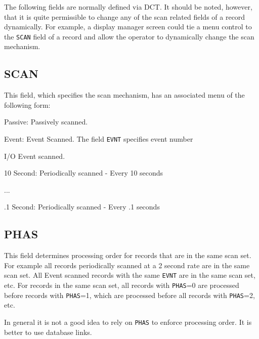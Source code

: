 The following fields are normally defined via DCT. It should be noted, however, that it is quite permissible to change any 
of the scan related fields of a record dynamically. For example, a display manager screen could tie a menu control to the 
\verb|SCAN| field of a record and allow the operator to dynamically change the scan mechanism.

\subsection{SCAN}

This field, which specifies the scan mechanism, has an associated menu of the following form:

\begin{description}\item {}Passive:  Passively scanned.

\item {}Event:  Event Scanned. The field \verb|EVNT| specifies event number

\item {}I/O Event scanned.

\item 10 Second:  Periodically scanned - Every 10 seconds

\item ...

\item .1 Second:  Periodically scanned - Every .1 seconds

\end{description}\subsection{PHAS}

This field determines processing order for records that are in the same scan set. For example all records periodically 
scanned at a 2 second rate are in the same scan set. All Event scanned records with the same \verb|EVNT| are in the same scan 
set, etc. For records in the same scan set, all records with \verb|PHAS|=0 are processed before records with \verb|PHAS|=1, which are 
processed before all records with \verb|PHAS|=2, etc.

In general it is not a good idea to rely on \verb|PHAS| to enforce processing order. It is better to use database links.

